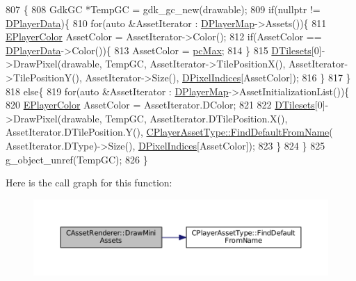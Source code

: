 \begin{DoxyCode}
807                                                         \{
808     GdkGC *TempGC = gdk\_gc\_new(drawable);
809     \textcolor{keywordflow}{if}(\textcolor{keyword}{nullptr} != \hyperlink{classCAssetRenderer_ae0f36013db2ef04b08b74d92249c1af5}{DPlayerData})\{
810         \textcolor{keywordflow}{for}(\textcolor{keyword}{auto} &AssetIterator : \hyperlink{classCAssetRenderer_a422a3f7e4202e73431fba7036e494dfe}{DPlayerMap}->Assets())\{
811             \hyperlink{GameDataTypes_8h_aafb0ca75933357ff28a6d7efbdd7602f}{EPlayerColor} AssetColor = AssetIterator->Color();
812             \textcolor{keywordflow}{if}(AssetColor == \hyperlink{classCAssetRenderer_ae0f36013db2ef04b08b74d92249c1af5}{DPlayerData}->Color())\{
813                 AssetColor = \hyperlink{GameDataTypes_8h_aafb0ca75933357ff28a6d7efbdd7602fa594a5c8dd3987f24e8a0f23f1a72cd34}{pcMax};
814             \}
815             \hyperlink{classCAssetRenderer_ae8201de704851c1de6424a8da77b785e}{DTilesets}[0]->DrawPixel(drawable, TempGC, AssetIterator->TilePositionX(), 
      AssetIterator->TilePositionY(), AssetIterator->Size(), \hyperlink{classCAssetRenderer_aa1d9cd6de6b897ec0b5a244bf822e6bd}{DPixelIndices}[AssetColor]);
816         \}
817     \}
818     \textcolor{keywordflow}{else}\{
819         \textcolor{keywordflow}{for}(\textcolor{keyword}{auto} &AssetIterator : \hyperlink{classCAssetRenderer_a422a3f7e4202e73431fba7036e494dfe}{DPlayerMap}->AssetInitializationList())\{
820             \hyperlink{GameDataTypes_8h_aafb0ca75933357ff28a6d7efbdd7602f}{EPlayerColor} AssetColor = AssetIterator.DColor;
821 
822             \hyperlink{classCAssetRenderer_ae8201de704851c1de6424a8da77b785e}{DTilesets}[0]->DrawPixel(drawable, TempGC, AssetIterator.DTilePosition.X(), 
      AssetIterator.DTilePosition.Y(), \hyperlink{classCPlayerAssetType_a7e1684eac4efaf7afe9a5c15af262b33}{CPlayerAssetType::FindDefaultFromName}(
      AssetIterator.DType)->Size(), \hyperlink{classCAssetRenderer_aa1d9cd6de6b897ec0b5a244bf822e6bd}{DPixelIndices}[AssetColor]);
823         \}
824     \}
825     g\_object\_unref(TempGC);
826 \}
\end{DoxyCode}
Here is the call graph for this function\+:\nopagebreak
\begin{figure}[H]
\begin{center}
\leavevmode
\includegraphics[width=350pt]{classCAssetRenderer_aeae64eefc83960997f372880140aaaa5_cgraph}
\end{center}
\end{figure}
\hypertarget{classCAssetRenderer_a1d2941f9b7aa116f578642c62410bb4a}{}\label{classCAssetRenderer_a1d2941f9b7aa116f578642c62410bb4a} 
